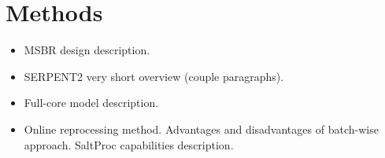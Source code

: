 
\section{Methods}


\begin{itemize}
        \item \gls{MSBR} design description.
	\item SERPENT2 very short overview (couple paragraphs).
	\item Full-core model description.
	\item Online reprocessing method. Advantages and disadvantages of batch-wise approach. SaltProc capabilities description.
\end{itemize}
